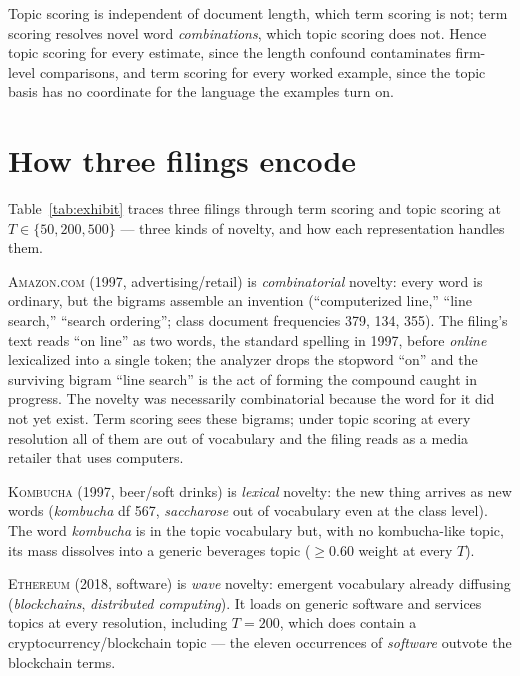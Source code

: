 \documentclass[11pt]{article}
\begin{document}
Topic scoring is independent of document length, which term scoring is not; term scoring
resolves novel word \emph{combinations}, which topic scoring does not. Hence
topic scoring for every estimate, since the length confound contaminates
firm-level comparisons, and term scoring for every worked example, since the
topic basis has no coordinate for the language the examples turn on.

\section{How three filings encode}\label{app:exhibit}

Table~\ref{tab:exhibit} traces three filings through term scoring and topic
scoring at $T \in \{50, 200, 500\}$ --- three kinds of novelty, and how each
representation handles them.

\textsc{Amazon.com} (1997, advertising/retail) is \emph{combinatorial}
novelty: every word is ordinary, but the bigrams assemble an invention
(``computerized line,'' ``line search,'' ``search ordering''; class
document frequencies 379, 134, 355). The filing's text reads ``on line''
as two words, the standard spelling in 1997, before \emph{online}
lexicalized into a single token; the analyzer drops the stopword ``on''
and the surviving bigram ``line search'' is the act of forming the
compound caught in progress. The novelty was necessarily combinatorial
because the word for it did not yet exist. Term scoring sees these
bigrams; under topic scoring at every resolution all of them are out of
vocabulary and the filing reads as a media retailer that uses computers.

\textsc{Kombucha} (1997, beer/soft drinks) is \emph{lexical} novelty: the
new thing arrives as new words (\emph{kombucha} df 567, \emph{saccharose}
out of vocabulary even at the class level). The word \emph{kombucha} is in
the topic vocabulary but, with no kombucha-like topic, its mass dissolves
into a generic beverages topic ($\geq 0.60$ weight at every $T$).

\textsc{Ethereum} (2018, software) is \emph{wave} novelty: emergent
vocabulary already diffusing (\emph{blockchains}, \emph{distributed
computing}). It loads on generic software and services topics at every
resolution, including $T = 200$, which does contain a
cryptocurrency/blockchain topic --- the eleven occurrences of
\emph{software} outvote the blockchain terms.
\end{document}
